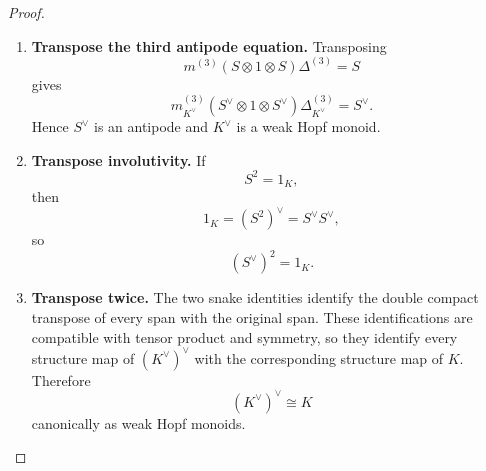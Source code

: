 \documentclass[oneside]{article}
\theoremstyle{plain}
\theoremstyle{definition}
\theoremstyle{remark}
\begin{document}
\begin{proof}
\begin{enumerate}[beginpenalty=10000]
        \item \textbf{Transpose the third antipode equation.}
        Transposing
        \[
            m^{(3)}
            (S\otimes1\otimes S)
            \Delta^{(3)}
            =
            S
        \]
        gives
        \[
            m_{K^\vee}^{(3)}
            (S^\vee\otimes1\otimes S^\vee)
            \Delta_{K^\vee}^{(3)}
            =
            S^\vee.
        \]
        Hence \(S^\vee\) is an antipode and \(K^\vee\) is a weak Hopf
        monoid.

        \item \textbf{Transpose involutivity.}
        If
        \[
            S^2=1_K,
        \]
        then
        \[
            1_K
            =
            (S^2)^\vee
            =
            S^\vee S^\vee,
        \]
        so
        \[
            (S^\vee)^2=1_K.
        \]

        \item \textbf{Transpose twice.}
        The two snake identities identify the double compact transpose
        of every span with the original span. These identifications are
        compatible with tensor product and symmetry, so they identify
        every structure map of \((K^\vee)^\vee\) with the corresponding
        structure map of \(K\). Therefore
        \[
            (K^\vee)^\vee
            \cong
            K
        \]
        canonically as weak Hopf monoids. \qedhere
    \end{enumerate}
\end{proof}
\end{document}
